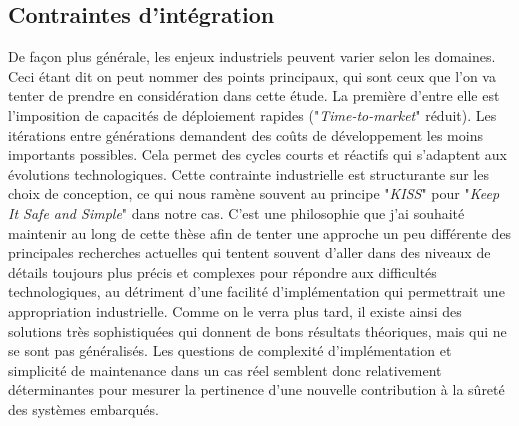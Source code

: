 \documentclass[french, a4paper, 11pt, twoside, pdftex]{StyleThese}
\begin{document}
	\subsection{Contraintes d'intégration}
			
	De façon plus générale, les enjeux industriels peuvent varier selon les domaines. Ceci étant dit on peut nommer des points principaux, qui sont ceux que l'on va tenter de prendre en considération dans cette étude. La première d'entre elle est l'imposition de capacités de déploiement rapides ("\textit{Time-to-market}" réduit). Les itérations entre générations demandent des coûts de développement les moins importants possibles. Cela permet des cycles courts et réactifs qui s'adaptent aux évolutions technologiques. Cette contrainte industrielle est structurante sur les choix de conception, ce qui nous ramène souvent au principe "\emph{KISS}" pour "\emph{Keep It Safe and Simple}" dans notre cas. C'est une philosophie que j'ai souhaité maintenir au long de cette thèse afin de tenter une approche un peu différente des principales recherches actuelles qui tentent souvent d'aller dans des niveaux de détails toujours plus précis et complexes pour répondre aux difficultés technologiques, au détriment d'une facilité d'implémentation qui permettrait une appropriation industrielle. Comme on le verra plus tard, il existe ainsi des solutions très sophistiquées qui donnent de bons résultats théoriques, mais qui ne se sont pas généralisés. Les questions de complexité d'implémentation et simplicité de maintenance dans un cas réel semblent donc relativement déterminantes pour mesurer la pertinence d'une nouvelle contribution à la sûreté des systèmes embarqués. 
	
\end{document}
